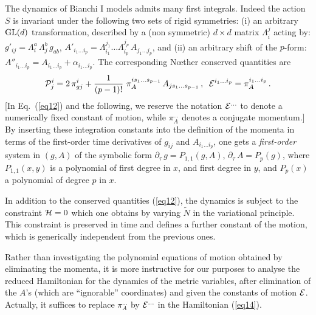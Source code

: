 \documentclass[a4paper,12pt]{article}
\begin{document}
The dynamics of Bianchi I models
admits many first integrals. Indeed the action $S$ is invariant under 
the following two sets of rigid symmetries: (i) an arbitrary ${\rm GL} 
(d)$ transformation, described by a (non symmetric) $d \times d$ matrix 
$\Lambda_i^j$ acting by: $g'_{ij} = \Lambda_i^a \, \Lambda_j^b \, 
g_{ab}$, $A'_{i_1 \ldots i_p} = \Lambda_{i_1}^{j_1} \ldots 
\Lambda_{i_p}^{j_p} \, A_{j_1 \ldots j_p}$, and (ii) an arbitrary shift 
of the $p$-form: $A''_{i_1 \ldots i_p} = A_{i_1 \ldots i_p} + 
\alpha_{i_1 \ldots i_p}$. The corresponding N\oe ther conserved 
quantities are 
\begin{equation}
{\cal P}_j^i = 2 \, \pi_{gj}^i + \frac{1}{(p-1)!} \ \pi_A^{is_1 \ldots 
s_{p-1}} \, A_{j s_1 \ldots s_{p-1}} \, ,  \; \; 
{\cal E}^{i_1 \ldots i_p} = \pi_A^{i_1 \ldots i_p} \,. 
\label{eq12}
\end{equation}
[In Eq.~(\ref{eq12}) and the following, we reserve the notation ${\cal 
E}^{\ldots}$ to denote a numerically fixed constant of motion, while 
$\pi_A^{\ldots}$ denotes a conjugate momentum.] 
By inserting these integration constants into the definition
of the momenta in terms of the first-order time derivatives
of $g_{ij}$ and $A_{i_1 \ldots i_p}$, 
one gets a {\it first-order} system in $(g,A)$
of the symbolic form $\partial_{\tau} \, g = P_{1,1} (g,A)$,
$\partial_{\tau} \, A = P_p (g)$, where $P_{1,1} (x,y)$ is a polynomial
of first degree in $x$, and first degree in $y$, and $P_p (x)$ a
polynomial of degree $p$ in $x$.
 
In addition to the conserved quantities (\ref{eq12}), the dynamics 
is subject to the constraint
${\cal H} = 0$
which one obtains by varying $\tilde{N}$ in the
variational principle.  This constraint is preserved
in time and defines a further constant of the motion, which
is generically independent from the previous ones.

Rather than investigating the polynomial
equations of motion obtained by eliminating the momenta,
it is more instructive for our purposes to
analyse 
the reduced Hamiltonian for the dynamics of the metric
variables, after 
elimination of the $A$'s (which are ``ignorable'' coordinates)
and given the constants of motion ${\cal E}$. 
Actually, it suffices to replace $\pi_A^{\ldots}$ by ${\cal 
E}^{\ldots}$ in the Hamiltonian (\ref{eq14}). 
\end{document}
